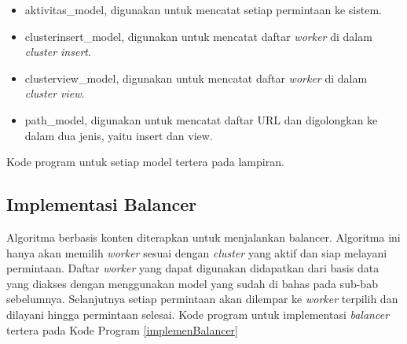 \documentclass{ta-its}
\begin{document}
		        \begin{itemize}
		        	\item aktivitas\_model, digunakan untuk mencatat setiap permintaan ke sistem.
		        	\item clusterinsert\_model, digunakan untuk mencatat daftar \textit{worker} di dalam \textit{cluster insert}.
		        	\item clusterview\_model, digunakan untuk mencatat daftar \textit{worker} di dalam \textit{cluster view}.
		        	\item path\_model, digunakan untuk mencatat daftar URL dan digolongkan ke dalam dua jenis, yaitu insert dan view.
		        \end{itemize}
		        
		        Kode program untuk setiap model tertera pada lampiran.
			
			\subsection{Implementasi Balancer}
				Algoritma berbasis konten diterapkan untuk menjalankan balancer. Algoritma ini hanya akan memilih \textit{worker} sesuai dengan \textit{cluster} yang aktif dan siap melayani permintaan. Daftar \textit{worker} yang dapat digunakan didapatkan dari basis data yang diakses dengan menggunakan model yang sudah di bahas pada sub-bab sebelumnya. Selanjutnya setiap permintaan akan dilempar ke \textit{worker} terpilih dan dilayani hingga permintaan selesai. Kode program untuk implementasi \textit{balancer} tertera pada Kode Program \ref{implemenBalancer}
				
\end{document}
